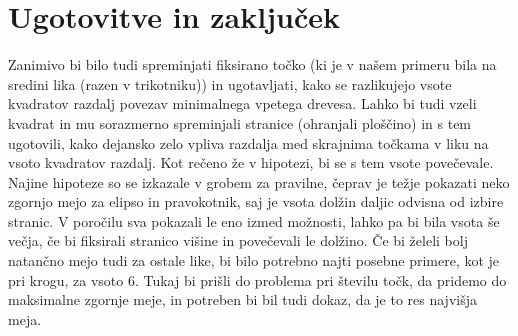 \documentclass[a4paper]{report}
\begin{document}
\section{Ugotovitve in zaključek}

Zanimivo bi bilo tudi spreminjati fiksirano točko (ki je v našem primeru bila na sredini lika (razen v trikotniku)) in ugotavljati, kako se razlikujejo vsote kvadratov razdalj povezav minimalnega vpetega drevesa. Lahko bi tudi vzeli kvadrat in mu sorazmerno spreminjali stranice (ohranjali ploščino) in s tem ugotovili, kako dejansko zelo vpliva razdalja med skrajnima točkama v liku na vsoto kvadratov razdalj. Kot rečeno že v hipotezi, bi se s tem vsote povečevale.\\
Najine hipoteze so se izkazale v grobem za pravilne, čeprav je težje pokazati neko zgornjo mejo za elipso in pravokotnik, saj je vsota dolžin daljic odvisna od izbire stranic. V poročilu sva pokazali le eno izmed možnosti, lahko pa bi bila vsota še večja, če bi fiksirali stranico višine in povečevali le dolžino. Če bi želeli bolj natančno mejo tudi za ostale like, bi bilo potrebno najti posebne primere, kot je pri krogu, za vsoto 6. Tukaj bi prišli do problema pri številu točk, da pridemo do maksimalne zgornje meje, in potreben bi bil tudi dokaz, da je to res najvišja meja. 
\end{document}
